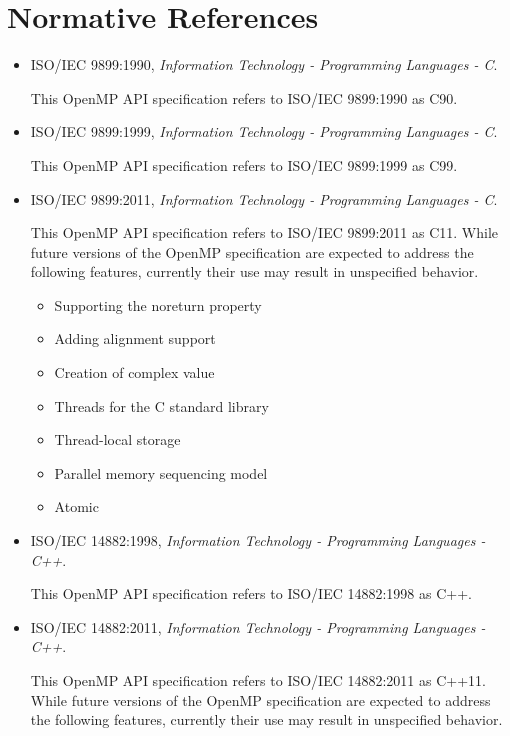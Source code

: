 \section{Normative References}
\label{sec:normative references}
\begin{itemize}
\item ISO/IEC 9899:1990, \textsl{Information Technology - Programming Languages - C}.

This OpenMP API specification refers to ISO/IEC 9899:1990 as C90.

\item ISO/IEC 9899:1999, \textsl{Information Technology - Programming Languages - C}.

This OpenMP API specification refers to ISO/IEC 9899:1999 as C99.

\item ISO/IEC 9899:2011, \textsl{Information Technology - Programming Languages - C}.

This OpenMP API specification refers to ISO/IEC 9899:2011 as C11.
While future versions of the OpenMP specification are expected to 
address the following features, currently their use may result in 
unspecified behavior.

\begin{itemize}
\item Supporting the noreturn property
\item Adding alignment support
\item Creation of complex value
\item Threads for the C standard library
\item Thread-local storage
\item Parallel memory sequencing model
\item Atomic
\end{itemize}

\item ISO/IEC 14882:1998, \textsl{Information Technology - Programming Languages - C++}.

This OpenMP API specification refers to ISO/IEC 14882:1998 as C++.

\item ISO/IEC 14882:2011, \textsl{Information Technology - Programming Languages - C++}.

This OpenMP API specification refers to ISO/IEC 14882:2011 as C++11. 
While future versions of the OpenMP specification are expected to
address the following features, currently their use may result in
unspecified behavior.


\end{itemize}
